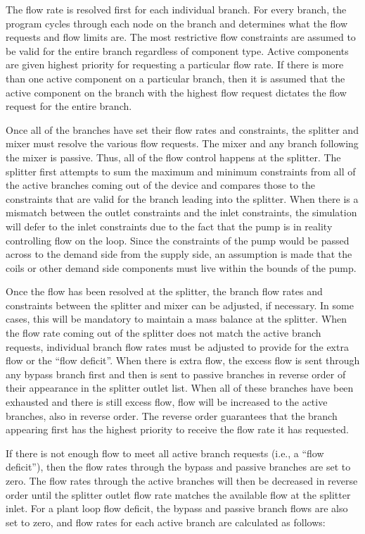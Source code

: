 The flow rate is resolved first for each individual branch. For every branch, the program cycles through each node on the branch and determines what the flow requests and flow limits are. The most restrictive flow constraints are assumed to be valid for the entire branch regardless of component type. Active components are given highest priority for requesting a particular flow rate. If there is more than one active component on a particular branch, then it is assumed that the active component on the branch with the highest flow request dictates the flow request for the entire branch.

Once all of the branches have set their flow rates and constraints, the splitter and mixer must resolve the various flow requests. The mixer and any branch following the mixer is passive. Thus, all of the flow control happens at the splitter. The splitter first attempts to sum the maximum and minimum constraints from all of the active branches coming out of the device and compares those to the constraints that are valid for the branch leading into the splitter. When there is a mismatch between the outlet constraints and the inlet constraints, the simulation will defer to the inlet constraints due to the fact that the pump is in reality controlling flow on the loop. Since the constraints of the pump would be passed across to the demand side from the supply side, an assumption is made that the coils or other demand side components must live within the bounds of the pump.

Once the flow has been resolved at the splitter, the branch flow rates and constraints between the splitter and mixer can be adjusted, if necessary. In some cases, this will be mandatory to maintain a mass balance at the splitter. When the flow rate coming out of the splitter does not match the active branch requests, individual branch flow rates must be adjusted to provide for the extra flow or the ``flow deficit''. When there is extra flow, the excess flow is sent through any bypass branch first and then is sent to passive branches in reverse order of their appearance in the splitter outlet list. When all of these branches have been exhausted and there is still excess flow, flow will be increased to the active branches, also in reverse order. The reverse order guarantees that the branch appearing first has the highest priority to receive the flow rate it has requested.

If there is not enough flow to meet all active branch requests (i.e., a ``flow deficit''), then the flow rates through the bypass and passive branches are set to zero. The flow rates through the active branches will then be decreased in reverse order until the splitter outlet flow rate matches the available flow at the splitter inlet. For a plant loop flow deficit, the bypass and passive branch flows are also set to zero, and flow rates for each active branch are calculated as follows:

